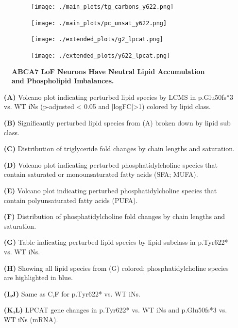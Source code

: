 \begin{figure}[H]
\begin{subfigure}[t]{.3\textwidth}
        \caption{}
        \texttt{[image: ./main\_plots/tg\_carbons\_y622.png]}        
    \end{subfigure} 
    \begin{subfigure}[t]{.3\textwidth}
        \caption{}
        \texttt{[image: ./main\_plots/pc\_unsat\_y622.png]}        
    \end{subfigure} 
    \begin{subfigure}[t]{.2\textwidth}
        \caption{}
        \texttt{[image: ./extended\_plots/g2\_lpcat.png]}        
    \end{subfigure} 
    \begin{subfigure}[t]{.2\textwidth}
        \caption{}
        \texttt{[image: ./extended\_plots/y622\_lpcat.png]}        
    \end{subfigure} 
    \caption{
        \textbf{ABCA7 LoF Neurons Have Neutral Lipid Accumulation and Phospholipid Imbalances.}\\
    }
    \label{fig:main_lipids}
\end{figure}
\begin{itemize}
    \item[\textbf{(A)}] Volcano plot indicating perturbed lipid species by LCMS in p.Glu50fs*3 vs. WT iNs (p-adjusted < 0.05 and |logFC|>1) colored by lipid class.
    \item[\textbf{(B)}] Significantly perturbed lipid species from (A) broken down by lipid sub class.
    \item[\textbf{(C)}] Distribution of triglyceride fold changes by chain lengths and saturation.
    \item[\textbf{(D)}] Volcano plot indicating perturbed phosphatidylcholine species that contain saturated or monounsaturated fatty acids (SFA; MUFA). 
    \item[\textbf{(E)}] Volcano plot indicating perturbed phosphatidylcholine species that contain polyunsaturated fatty acids (PUFA).
    \item[\textbf{(F)}] Distribution of phosphatidylcholine fold changes by chain lengths and saturation. 
    \item[\textbf{(G)}] Table indicating perturbed lipid species by lipid subclass in p.Tyr622* vs. WT iNs.
    \item[\textbf{(H)}] Showing all lipid species from (G) colored; phosphatidylcholine species are highlighted in blue.
    \item[\textbf{(I,J)}] Same as C,F for p.Tyr622* vs. WT iNs.
    \item[\textbf{(K,L)}] LPCAT gene changes in p.Tyr622* vs. WT iNs and p.Glu50fs*3 vs. WT iNs (mRNA).
\end{itemize}